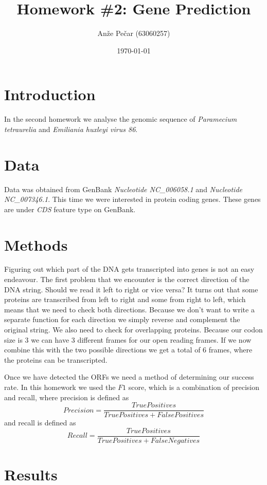 \documentclass[a4paper,11pt]{article}
\title{Homework \#2: Gene Prediction}
\author{Anže Pečar (63060257)}
\date{\today}
\begin{document}
\maketitle

\section{Introduction}

In the second homework we analyse the genomic sequence of \textit{Paramecium tetraurelia} and \textit{Emiliania huxleyi virus 86}.

\section{Data}

Data was obtained from GenBank \textit{Nucleotide NC\_006058.1} and \textit{Nucleotide NC\_007346.1}. This time we were interested in protein coding genes. These genes are under \textit{CDS} feature type on GenBank.

\section{Methods}

Figuring out which part of the DNA gets transcripted into genes is not an easy endeavour. The first problem that we encounter is the correct direction of the DNA string. Should we read it left to right or vice versa? It turns out that some proteins are transcribed from left to right and some from right to left, which means that we need to check both directions. Because we don't want to write a separate function for each direction we simply reverse and complement the original string. We also need to check for overlapping proteins. Because our codon size is 3 we can have 3 different frames for our open reading frames. If we now combine this with the two possible directions we get a total of 6 frames, where the proteins can be transcripted.

Once we have detected the ORFs we need a method of determining our success rate. In this homework we used the $F1$ score, which is a combination of precision and recall, where precision is defined as 
\[
Precision = \frac{TruePositives }{TruePositives + FalsePositives}
\]
and recall is defined as
\[
Recall = \frac{TruePositives }{TruePositives + FalseNegatives}
\]

\section{Results}
\end{document}
